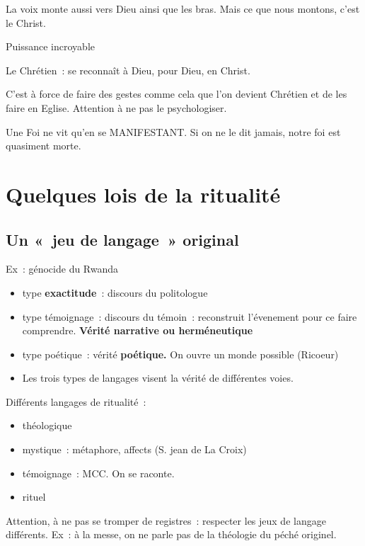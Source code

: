 La voix monte aussi vers Dieu ainsi que les bras. Mais ce que nous
montons, c'est le Christ.

Puissance incroyable

Le Chrétien~: se reconnaît à Dieu, pour Dieu, en Christ.

C'est à force de faire des gestes comme cela que l'on devient Chrétien
et de les faire en Eglise. Attention à ne pas le psychologiser.

Une Foi ne vit qu'en se MANIFESTANT. Si on ne le dit jamais, notre foi
est quasiment morte.

\hypertarget{quelques-lois-de-la-ritualituxe9}{%
\section{Quelques lois de la
ritualité}\label{quelques-lois-de-la-ritualituxe9}}

\hypertarget{un-jeu-de-langage-original}{%
\subsection{Un «~jeu de langage~»
original}\label{un-jeu-de-langage-original}}

Ex~: génocide du Rwanda

\begin{itemize}
\item
  type \textbf{exactitude}~: discours du politologue
\item
  type témoignage~: discours du témoin~: reconstruit l'évenement pour ce
  faire comprendre. \textbf{Vérité narrative ou herméneutique}
\item
  type poétique~: vérité \textbf{poétique.} On ouvre un monde possible
  (Ricoeur)
\item
  Les trois types de langages visent la vérité de différentes voies.
\end{itemize}

Différents langages de ritualité~:

\begin{itemize}
\item
  théologique
\item
  mystique~: métaphore, affects (S. jean de La Croix)
\item
  témoignage~: MCC. On se raconte.
\item
  rituel
\end{itemize}

Attention, à ne pas se tromper de registres~: respecter les jeux de
langage différents. Ex~: à la messe, on ne parle pas de la théologie du
péché originel.

